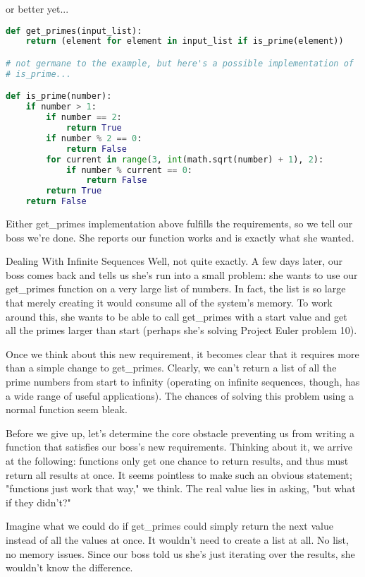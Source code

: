 or better yet...

\begin{lstlisting}[language=Python]
def get_primes(input_list):
    return (element for element in input_list if is_prime(element))

# not germane to the example, but here's a possible implementation of
# is_prime...

def is_prime(number):
    if number > 1:
        if number == 2:
            return True
        if number % 2 == 0:
            return False
        for current in range(3, int(math.sqrt(number) + 1), 2):
            if number % current == 0:
                return False
        return True
    return False
\end{lstlisting}

Either get_primes implementation above fulfills the requirements, so we tell our boss we're done. She reports our function works and is exactly what she wanted.

Dealing With Infinite Sequences
Well, not quite exactly. A few days later, our boss comes back and tells us she's run into a small problem: she wants to use our get_primes function on a very large list of numbers. In fact, the list is so large that merely creating it would consume all of the system's memory. To work around this, she wants to be able to call get_primes with a start value and get all the primes larger than start (perhaps she's solving Project Euler problem 10).

Once we think about this new requirement, it becomes clear that it requires more than a simple change to get_primes. Clearly, we can't return a list of all the prime numbers from start to infinity (operating on infinite sequences, though, has a wide range of useful applications). The chances of solving this problem using a normal function seem bleak.

Before we give up, let's determine the core obstacle preventing us from writing a function that satisfies our boss's new requirements. Thinking about it, we arrive at the following: functions only get one chance to return results, and thus must return all results at once. It seems pointless to make such an obvious statement; "functions just work that way," we think. The real value lies in asking, "but what if they didn't?"

Imagine what we could do if get_primes could simply return the next value instead of all the values at once. It wouldn't need to create a list at all. No list, no memory issues. Since our boss told us she's just iterating over the results, she wouldn't know the difference.

